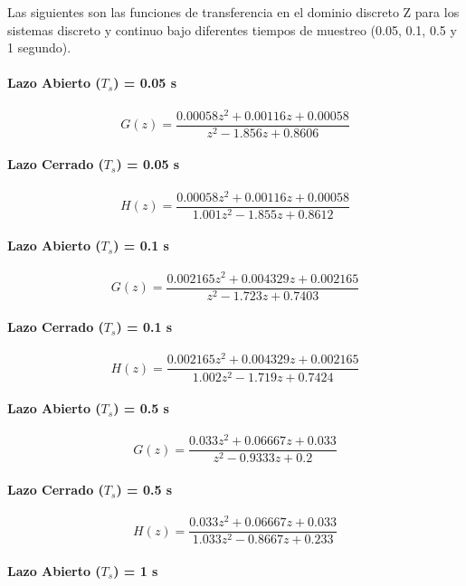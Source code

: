 \documentclass[journal]{IEEEtran}
\begin{document}
Las siguientes son las funciones de transferencia en el dominio discreto Z para los sistemas discreto y continuo bajo diferentes tiempos de muestreo (0.05, 0.1, 0.5 y 1 segundo).


\paragraph{Lazo Abierto ($T_s$) = 0.05 s}

$$G(z) = \frac{0.00058 z^2 + 0.00116 z + 0.00058}{z^2 - 1.856 z + 0.8606}$$

\paragraph{Lazo Cerrado ($T_s$) = 0.05 s}

$$H(z) = \frac{0.00058 z^2 + 0.00116 z + 0.00058}{1.001 z^2 - 1.855 z + 0.8612}$$



\paragraph{Lazo Abierto ($T_s$) = 0.1 s}

$$G(z) = \frac{0.002165 z^2 + 0.004329 z + 0.002165}{z^2 - 1.723 z + 0.7403}$$

\paragraph{Lazo Cerrado ($T_s$) = 0.1 s}

$$H(z) = \frac{0.002165 z^2 + 0.004329 z + 0.002165}{1.002 z^2 - 1.719 z + 0.7424}$$


\paragraph{Lazo Abierto ($T_s$) = 0.5 s}

$$G(z) = \frac{0.033 z^2 + 0.06667 z + 0.033}{z^2 - 0.9333 z + 0.2}$$

\paragraph{Lazo Cerrado ($T_s$) = 0.5 s}

$$H(z) = \frac{0.033 z^2 + 0.06667 z + 0.033}{1.033 z^2 - 0.8667 z + 0.233}$$



\paragraph{Lazo Abierto ($T_s$) = 1 s}
\end{document}
